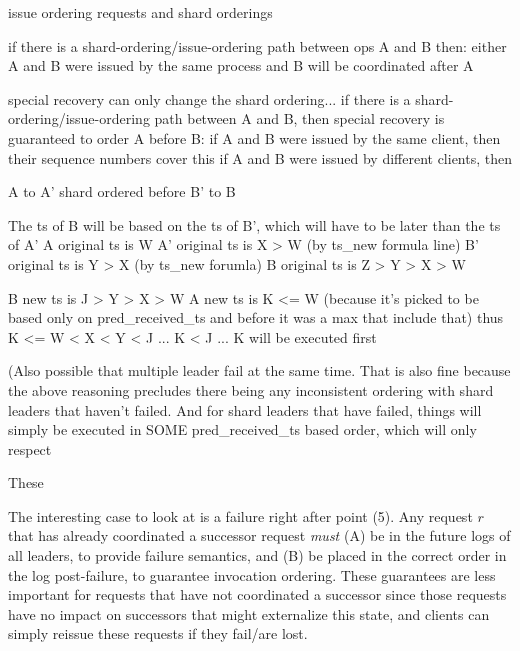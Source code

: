 issue ordering requests
and
shard orderings


if there is a shard-ordering/issue-ordering path between ops A and B then:
either A and B were issued by the same process and B will be coordinated after A


special recovery can only change the shard ordering...
if there is a shard-ordering/issue-ordering path between A and B, then special recovery is guaranteed to order A before B:
if A and B were issued by the same client, then their sequence numbers cover this
if A and B were issued by different clients, then

A to A' shard ordered before B' to B

The ts of B will be based on the ts of B', which will have to be later than the ts of A'
A original ts is W
A' original ts is X > W (by ts\_new formula line)
B' original ts is Y > X (by ts\_new forumla)
B original ts is Z > Y > X > W

B new ts is J > Y > X > W
A new ts is K <= W (because it's picked to be based only on pred\_received\_ts and before it was a max that include that)
thus K <= W < X < Y < J ... K < J ... K will be executed first

(Also possible that multiple leader fail at the same time. That is also fine because the above reasoning precludes there being any inconsistent ordering with shard leaders that haven't failed. And for shard leaders that have failed, things will simply be executed in SOME pred\_received\_ts based order, which will only respect







These 



The interesting case to look at is a failure right after point (5). Any request $r$ that has already coordinated a successor request \textit{must} (A) be in the future logs of all leaders, to provide failure semantics, and (B) be placed in the correct order in the log post-failure, to guarantee invocation ordering. These guarantees are less important for requests that have not coordinated a successor since those requests have no impact on successors that might externalize this state, and clients can simply reissue these requests if they fail/are lost.


